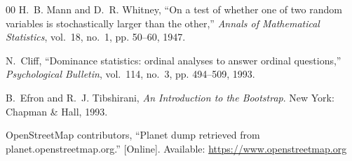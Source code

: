 \documentclass[conference]{IEEEtran}
\begin{document}
\begin{thebibliography}{00}
H.~B. Mann and D.~R. Whitney, ``On a test of whether one of two random variables is stochastically larger than the other,'' \emph{Annals of Mathematical Statistics}, vol.~18, no.~1, pp. 50--60, 1947.

N.~Cliff, ``Dominance statistics: ordinal analyses to answer ordinal questions,'' \emph{Psychological Bulletin}, vol.~114, no.~3, pp. 494--509, 1993.

B.~Efron and R.~J. Tibshirani, \emph{An Introduction to the Bootstrap}. New York: Chapman \& Hall, 1993.

OpenStreetMap contributors, ``Planet dump retrieved from planet.openstreetmap.org.'' [Online]. Available: \url{https://www.openstreetmap.org}
\end{thebibliography}
\end{document}
